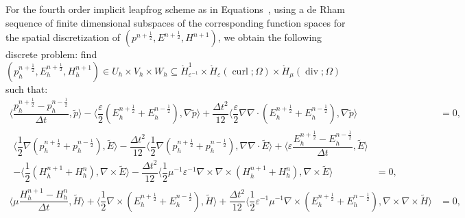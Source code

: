 \documentclass{amsart}
\theoremstyle{thmstyleone}%
\theoremstyle{thmstyletwo}%
\theoremstyle{thmstylethree}%
\DeclareMathOperator{\curl}{curl}
\def\divgn{\operatorname{div}}
\newcommand{\aInnerproduct}[2]{\bigl\langle #1, #2 \bigr\rangle}
\begin{document}
For the fourth order implicit leapfrog scheme as in Equations~, using a de Rham sequence of finite dimensional subspaces of the corresponding function spaces for the spatial discretization of $(p^{n + \frac{1}{2}}, E^{n + \frac{1}{2}}, H^{n + 1})$, we obtain the following discrete problem: find $(p_h^{n + \frac{1}{2}}, E_h^{n + \frac{1}{2}}, H_h^{n + 1}) \in U_h \times V_h \times W_h \subseteq \mathring{H}_{\varepsilon^{-1}}^1 \times \mathring{H}_{\varepsilon}(\curl; \Omega) \times \mathring{H}_{\mu}(\divgn; \Omega)$ such that:
\begin{subequations}
\begin{align}
  \aInnerproduct{\dfrac{p_h^{n + \frac{1}{2}} - p_h^{n - \frac{1}{2}}}{\Delta t}}{\widetilde{p}} - \aInnerproduct{\dfrac{\varepsilon}{2} \left( E_h^{n + \frac{1}{2}} + E_h^{n - \frac{1}{2}} \right)}{\nabla \widetilde{p}} + \dfrac{\Delta t^2}{12} \aInnerproduct{\dfrac{\varepsilon}{2} \nabla \nabla \cdot \left( E_h^{n + \frac{1}{2}} + E_h^{n - \frac{1}{2}} \right)}{\nabla \widetilde{p}} &=0, \label{eqn:maxwell_p_lf4_full} \\
  \begin{split}
   \aInnerproduct{\dfrac{1}{2} \nabla \left(p_h^{n + \frac{1}{2}} + p_h^{n - \frac{1}{2}} \right)}{\widetilde{E}} - \dfrac{\Delta t^2}{12} \aInnerproduct{\dfrac{1}{2} \nabla \left(p_h^{n + \frac{1}{2}} + p_h^{n - \frac{1}{2}} \right)}{\nabla \nabla \cdot \widetilde{E}} + \aInnerproduct{\varepsilon \dfrac{E_h^{n + \frac{1}{2}} - E_h^{n - \frac{1}{2}}}{\Delta t}}{\widetilde{E}} \\ - \aInnerproduct{\dfrac{1}{2} \left( H_h^{n + 1} + H_h^n \right)}{\nabla \times \widetilde{E}}  - \dfrac{\Delta t^2}{12} \aInnerproduct{\dfrac{1}{2} \mu^{-1}\varepsilon^{-1} \nabla \times \nabla \times \left( H_h^{n + 1} + H_h^n \right)}{\nabla \times \widetilde{E}} &= 0, \label{eqn:maxwell_E_lf4_full} 
     \end{split} \\
  \aInnerproduct{\mu \dfrac{H_h^{n + 1} - H_h^n}{\Delta t}}{\widetilde{H}} +  \aInnerproduct{\dfrac{1}{2} \nabla \times \left( E_h^{n + \frac{1}{2}} + E_h^{n - \frac{1}{2}} \right)}{\widetilde{H}} +  \dfrac{\Delta t^2}{12} \aInnerproduct{\dfrac{1}{2} \varepsilon^{-1}\mu^{-1} \nabla \times \left( E_h^{n + \frac{1}{2}} + E_h^{n - \frac{1}{2}} \right)}{\nabla \times  \nabla \times \widetilde{H}} &= 0, \label{eqn:maxwell_H_lf4_full}
\end{align}
\end{subequations}
\end{document}
